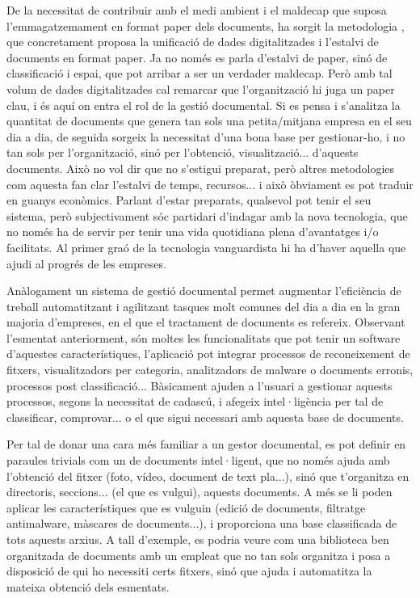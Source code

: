 \documentclass[letterpaper,11pt,catalan]{sphinxmanual}
\begin{document}
De la necessitat de contribuir amb el medi ambient i el maldecap que suposa l'emmagatzemament en format paper
dels documents, ha sorgit la metodologia , que concretament proposa la unificació de dades digitalitzades
i l'estalvi de documents en format paper. Ja no només es parla d'estalvi de paper, sinó de classificació i espai,
que pot arribar a ser un verdader maldecap. Però amb tal volum de dades digitalitzades cal remarcar
que l'organització hi juga un paper clau, i és aquí on entra el rol de la gestió documental. Si
es pensa i s'analitza la quantitat de documents que genera tan sols una petita/mitjana empresa
en el seu dia a dia, de seguida sorgeix la necessitat d'una bona base per gestionar-ho, i no tan sols per l'organització,
sinó per l'obtenció, visualització... d'aquests documents. Això no vol dir que no s'estigui preparat,
però altres metodologies com aquesta fan clar l'estalvi de temps, recursos... i això òbviament es pot
traduir en guanys econòmics. Parlant d'estar preparats, qualsevol pot tenir el seu sistema, però
subjectivament sóc partidari d'indagar amb la nova tecnologia, que no només ha de servir per tenir
una vida quotidiana plena d'avantatges i/o facilitats. Al primer graó de la tecnologia vanguardista
hi ha d'haver aquella que ajudi al progrés de les empreses.

Anàlogament un sistema de gestió documental permet augmentar l'eficiència de treball
automatitzant i agilitzant tasques molt comunes del dia a dia en la gran majoria d'empreses, en
el que el tractament de documents es refereix.
Observant l'esmentat anteriorment, són moltes les funcionalitats que pot tenir un software d'aquestes
característiques, l'aplicació pot integrar processos de reconeixement de fitxers, visualitzadors
per categoria, analitzadors de malware o documents erronis, processos post classificació...
Bàsicament ajuden a l'usuari a gestionar aquests processos, segons la necessitat de cadascú,
i afegeix intel·ligència per tal de classificar, comprovar... o el que sigui necessari amb aquesta
base de documents.

Per tal de donar una cara més familiar a un gestor documental, es pot definir en paraules trivials
com un  de documents intel·ligent, que no només ajuda amb l'obtenció del fitxer (foto, vídeo, document
de text pla...), sinó que t'organitza en directoris, seccions... (el que es vulgui), aquests documents.
A més se li poden aplicar les característiques que es vulguin (edició de documents, filtratge antimalware,
màscares de documents...), i proporciona una base classificada de tots aquests arxius. A tall
d'exemple, es podria veure com una biblioteca ben organitzada de documents amb
un empleat que no tan sols organitza i posa a disposició de qui ho necessiti certs fitxers, sinó que
ajuda i automatitza la mateixa obtenció dels esmentats.
\end{document}
